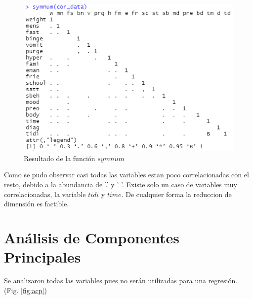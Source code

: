 \documentclass[a4paper,10pt,twocolumn]{article}
\begin{document}
\begin{figure}[htb]%
	\begin{center}
		\includegraphics[width=\linewidth]{symnum}
	\end{center}
	\caption{Resultado de la función $symnum$ \label{fig:symnum}}%
\end{figure}


Como se pudo observar casi todas las variables estan poco correlacionadas con el resto, debido a la abundancia de '.'  y  ' '. Existe solo un caso de variables muy correlacionadas, la variable $tidi$ y $time$. De cualquier forma la reduccion de dimensión es factible.

\section{Análisis de Componentes Principales}\label{sec:acp}


Se analizaron todas las variables pues no serán utilizadas para una regresión. (Fig. \ref{fig:acp})

\end{document}
